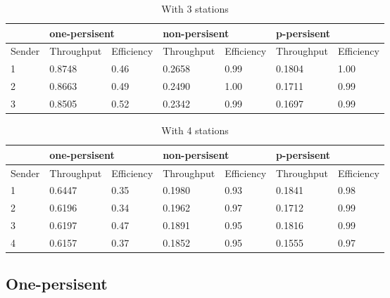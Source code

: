\documentclass[14pt,titlepage, a4paper]{extarticle}
\begin{document}
\begin{table}[!ht]
	\caption{With 3 stations}
	\bigskip
	\begin{tabular}{|l|l|l|l|l|l|l|}
		\hline
		&
		\multicolumn{2}{|l|}{one-persisent} & 
		\multicolumn{2}{|l|}{non-persisent} & 
		\multicolumn{2}{|l|}{p-persisent}\\
		\hline
		Sender &
		Throughput & Efficiency & 
		Throughput & Efficiency & 
		Throughput & Efficiency \\ 
		\hline
		1 &
		0.8748 & 0.46 &
		0.2658 & 0.99 &
		0.1804 & 1.00\\
		\hline
		2 &
		0.8663 & 0.49 & 
		0.2490 & 1.00 &
		0.1711 & 0.99\\
		\hline
		3 &
		0.8505 & 0.52 &
		0.2342 & 0.99 &
		0.1697 & 0.99\\
		\hline
	\end{tabular}
\end{table}

\begin{table}[!ht]
	\caption{With 4 stations}
	\bigskip
	\begin{tabular}{|l|l|l|l|l|l|l|}
		\hline
		&
		\multicolumn{2}{|l|}{one-persisent} & 
		\multicolumn{2}{|l|}{non-persisent} & 
		\multicolumn{2}{|l|}{p-persisent}\\
		\hline
		Sender &
		Throughput & Efficiency & 
		Throughput & Efficiency & 
		Throughput & Efficiency \\ 
		\hline
		1 &
		0.6447 & 0.35 &
		0.1980 & 0.93 & 
		0.1841 & 0.98\\
		\hline
		2 & 
		0.6196 & 0.34 &
		0.1962 & 0.97 & 
		0.1712 & 0.99\\
		\hline
		3 &
		0.6197 & 0.47 &
		0.1891 & 0.95 & 
		0.1816 & 0.99\\
		\hline
		4 &
		0.6157 & 0.37 & 
		0.1852 & 0.95 & 
		0.1555 & 0.97\\
		\hline
	\end{tabular}
\end{table}

\subsection{One-persisent}
\null
{}
\end{document}
